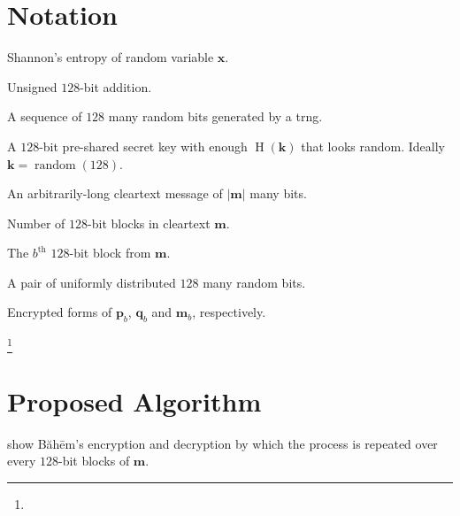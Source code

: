 \documentclass[twocolumn,hidelinks]{article}
\newcommand{\baheem}{Băhēm}
\newcommand\blfootnote[1]{%
  \begingroup
  \renewcommand\thefootnote{}\footnote{#1}%
  \addtocounter{footnote}{-1}%
  \endgroup
}
\DeclareMathOperator{\random}{random}
\DeclareMathOperator{\entropy}{H}
\begin{document}
\section*{Notation}
\begin{description}[itemsep=0em]
    \item[$\entropy(\mathbf{x})$:]  Shannon's entropy of random variable
        $\mathbf{x}$.

    \item[$\mathbf{x} + \mathbf{y} \bmod{2^{128}}$:]  Unsigned $128$-bit
        addition.

    \item[$\random(128)$:]  A sequence of $128$ many random bits generated
        by a \gls{trng}.

    \item[$\mathbf{k}$:]  A $128$-bit pre-shared secret key with enough
        $\entropy(\mathbf{k})$ that looks random.  Ideally $\mathbf{k} =
        \random(128)$.

    \item[$\mathbf{m}$:]  An arbitrarily-long cleartext message of
        $|\mathbf{m}|$ many bits.

    \item[$\lceil\frac{|\mathbf{m}|}{128}\rceil$:]  Number of $128$-bit
        blocks in cleartext $\mathbf{m}$.

    \item[$\mathbf{m}_b$:]  The $b^{\text{th}}$ $128$-bit block from
        $\mathbf{m}$.

    \item[$\mathbf{p}_b = \random(128), \mathbf{q}_b = \random(128)$:]  A
        pair of uniformly distributed $128$ many random bits.

    \item[$\mathbf{\hat p}_b, \mathbf{\hat q}_b, \mathbf{\hat m}_b$:]
        Encrypted forms of $\mathbf{p}_b$, $\mathbf{q}_b$ and
        $\mathbf{m}_b$, respectively.
\end{description}

\break

\tableofcontents

\blfootnote{\vspace{-1em}\doclicenseThis}

\section{Proposed Algorithm}
 show \baheem's encryption and decryption by which
the process is repeated over every $128$-bit blocks of $\mathbf{m}$.
\end{document}
